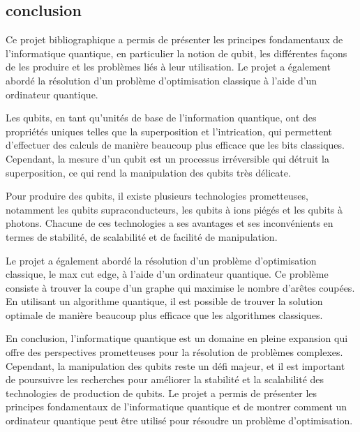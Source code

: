 \documentclass{article}
\begin{document}
\begin{multicols}{2}
\section{conclusion}

Ce projet bibliographique a permis de présenter les principes fondamentaux de l'informatique quantique, en particulier la notion de qubit, les différentes façons de les produire et les problèmes liés à leur utilisation. Le projet a également abordé la résolution d'un problème d'optimisation classique à l'aide d'un ordinateur quantique.

Les qubits, en tant qu'unités de base de l'information quantique, ont des propriétés uniques telles que la superposition et l'intrication, qui permettent d'effectuer des calculs de manière beaucoup plus efficace que les bits classiques. Cependant, la mesure d'un qubit est un processus irréversible qui détruit la superposition, ce qui rend la manipulation des qubits très délicate.

Pour produire des qubits, il existe plusieurs technologies prometteuses, notamment les qubits supraconducteurs, les qubits à ions piégés et les qubits à photons. Chacune de ces technologies a ses avantages et ses inconvénients en termes de stabilité, de scalabilité et de facilité de manipulation.

Le projet a également abordé la résolution d'un problème d'optimisation classique, le max cut edge, à l'aide d'un ordinateur quantique. Ce problème consiste à trouver la coupe d'un graphe qui maximise le nombre d'arêtes coupées. En utilisant un algorithme quantique, il est possible de trouver la solution optimale de manière beaucoup plus efficace que les algorithmes classiques.

En conclusion, l'informatique quantique est un domaine en pleine expansion qui offre des perspectives prometteuses pour la résolution de problèmes complexes. Cependant, la manipulation des qubits reste un défi majeur, et il est important de poursuivre les recherches pour améliorer la stabilité et la scalabilité des technologies de production de qubits. Le projet a permis de présenter les principes fondamentaux de l'informatique quantique et de montrer comment un ordinateur quantique peut être utilisé pour résoudre un problème d'optimisation.

\printbibliography

\end{multicols}
\end{document}
